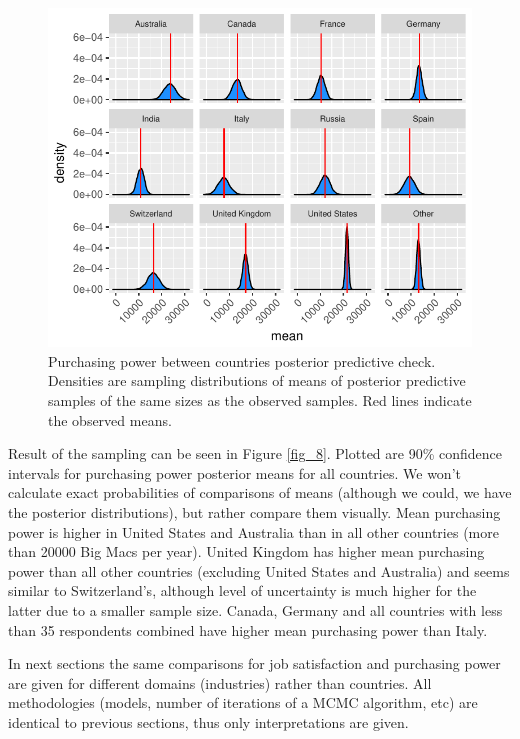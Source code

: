 \documentclass{article}
\begin{document}
\begin{figure}[H]
\centering
\includegraphics{report-027}
\caption{Purchasing power between countries posterior predictive check. Densities are sampling distributions of means of posterior predictive samples of the same sizes as the observed samples. Red lines indicate the observed means.}\label{fig_7}
\end{figure}

Result of the sampling can be seen in Figure \ref{fig_8}. Plotted are 90\% confidence intervals for purchasing power posterior means for all countries. We won't calculate exact probabilities of comparisons of means (although we could, we have the posterior distributions), but rather compare them visually. Mean purchasing power is higher in United States and Australia than in all other countries (more than 20000 Big Macs per year). United Kingdom has higher mean purchasing power than all other countries (excluding United States and Australia) and seems similar to Switzerland's, although level of uncertainty is much higher for the latter due to a smaller sample size. Canada, Germany and all countries with less than 35 respondents combined have higher mean purchasing power than Italy.

In next sections the same comparisons for job satisfaction and purchasing power are given for different domains (industries) rather than countries. All methodologies (models, number of iterations of a MCMC algorithm, etc) are identical to previous sections, thus only interpretations are given.
\end{document}
